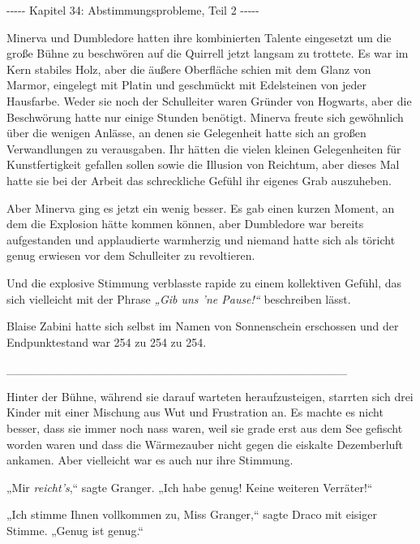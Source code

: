 

\hypertarget{abstimmungsprobleme-teil-2}{%

-\/-\/-\/-\/- Kapitel 34: Abstimmungsprobleme, Teil 2 -\/-\/-\/-\/-

Minerva und Dumbledore hatten ihre kombinierten Talente eingesetzt um die große Bühne zu beschwören auf die Quirrell jetzt langsam zu trottete. Es war im Kern stabiles Holz, aber die äußere Oberfläche schien mit dem Glanz von Marmor, eingelegt mit Platin und geschmückt mit Edelsteinen von jeder Hausfarbe. Weder sie noch der Schulleiter waren Gründer von Hogwarts, aber die Beschwörung hatte nur einige Stunden benötigt. Minerva freute sich gewöhnlich über die wenigen Anlässe, an denen sie Gelegenheit hatte sich an großen Verwandlungen zu verausgaben. Ihr hätten die vielen kleinen Gelegenheiten für Kunstfertigkeit gefallen sollen sowie die Illusion von Reichtum, aber dieses Mal hatte sie bei der Arbeit das schreckliche Gefühl ihr eigenes Grab auszuheben.

Aber Minerva ging es jetzt ein wenig besser. Es gab einen kurzen Moment, an dem die Explosion hätte kommen können, aber Dumbledore war bereits aufgestanden und applaudierte warmherzig und niemand hatte sich als töricht genug erwiesen vor dem Schulleiter zu revoltieren.

Und die explosive Stimmung verblasste rapide zu einem kollektiven Gefühl, das sich vielleicht mit der Phrase \emph{„Gib uns 'ne Pause!“} beschreiben lässt.

Blaise Zabini hatte sich selbst im Namen von Sonnenschein erschossen und der Endpunktestand war 254 zu 254 zu 254.

\_\_\_\_\_\_\_\_\_\_\_\_\_\_\_\_\_\_\_\_\_\_\_\_\_\_\_\_\_\_\_\_\_\_\_\_\_\_\_\_

Hinter der Bühne, während sie darauf warteten heraufzusteigen, starrten sich drei Kinder mit einer Mischung aus Wut und Frustration an. Es machte es nicht besser, dass sie immer noch nass waren, weil sie grade erst aus dem See gefischt worden waren und dass die Wärmezauber nicht gegen die eiskalte Dezemberluft ankamen. Aber vielleicht war es auch nur ihre Stimmung.

„Mir \emph{reicht's},“ sagte Granger. „Ich habe genug! Keine weiteren Verräter!“

„Ich stimme Ihnen vollkommen zu, Miss Granger,“ sagte Draco mit eisiger Stimme. „Genug ist genug.“

}
